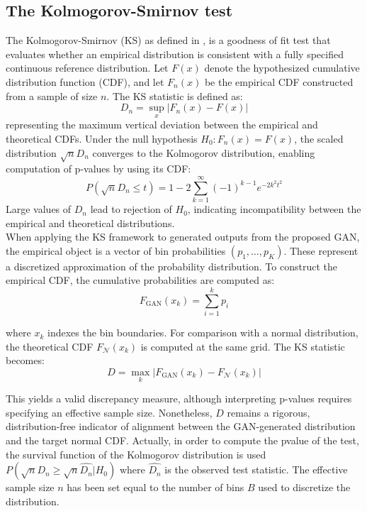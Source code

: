 \subsection{The Kolmogorov-Smirnov test}
The Kolmogorov-Smirnov (KS) as defined in \cite{background:ks_test}, is a goodness of fit test that evaluates whether an empirical distribution is consistent with a fully specified continuous reference distribution. 
Let $F(x)$ denote the hypothesized cumulative distribution function (CDF), 
and let $F_{n}(x)$ be the empirical CDF constructed from a sample of size $n$. 
The KS statistic is defined as:
\begin{equation}
    D_{n}=\sup_{x}\lvert F_{n}(x)-F(x)\rvert
\end{equation}
representing the maximum vertical deviation between the empirical and theoretical CDFs.
Under the null hypothesis $H_{0}: F_{n}(x)=F(x)$,
the scaled distribution $\sqrt{n}D_{n}$ converges to the Kolmogorov distribution, enabling computation of p-values by using its CDF:
\begin{equation*}
    P(\sqrt{n}D_{n}\le t)=1-2\sum_{k=1}^{\infty}(-1)^{k-1}e^{-2k^{2}t^{2}}
\end{equation*}
Large values of $D_{n}$ lead to rejection of $H_{0}$, indicating
incompatibility between the empirical and theoretical distributions.\\

When applying the KS framework to generated outputs from the proposed GAN, the empirical object is a vector of bin probabilities
$(p_{1},\dots,p_{K})$.  These represent a discretized approximation of the probability distribution. To construct the empirical CDF, 
the cumulative probabilities are computed as:
\begin{equation*}
    F_{\text{GAN}}(x_{k})=\sum_{i=1}^{k}p_{i}
\end{equation*}

where $x_k$ indexes the bin boundaries. For comparison with a normal distribution, the theoretical CDF
$F_{\mathcal N}(x_{k})$ is computed at the same grid. The KS statistic becomes:
\begin{equation*}
    D=\max_{k}\lvert F_{\text{GAN}}(x_{k})-F_{\mathcal N}(x_{k})\rvert
\end{equation*}

This yields a valid discrepancy measure, although interpreting p-values requires specifying an effective sample size.
Nonetheless, $D$ remains a rigorous, distribution-free indicator of alignment between the GAN-generated distribution and the target normal CDF.
Actually, in order to compute the p\-value of the test, the survival function of the Kolmogorov distribution is used $P(\sqrt{n}D_n \geq \sqrt{n}\hat{D_n} | H_0)$ 
where $\hat{D_n}$ is the observed test statistic. 
The effective sample size $n$ has been set equal to the number of bins $B$ used to discretize the distribution.

